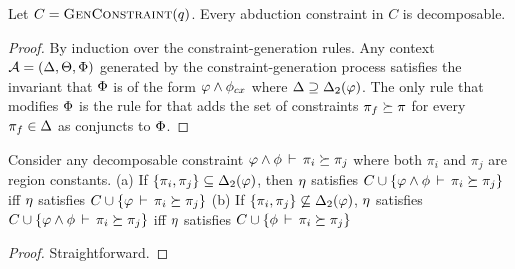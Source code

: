 \begin{lemma}
  \label{lemma:gc-is-decomposable}
  Let $C = \textsc{GenConstraint}(q)$. Every abduction constraint in $C$ is decomposable.
\end{lemma}

\begin{proof}
  By induction over the constraint-generation rules.
  Any context ${\mathcal{A}} = (\Delta,\Theta,\Phi)$ generated by the constraint-generation
  process satisfies the invariant that $\Phi$ is of the form $\varphi \wedge \phi_{cx}$
  where $\Delta \supseteq {\Delta_2}(\varphi)$.
  The only rule that modifies $\Phi$ is the rule for 
  that adds the set of constraints $\pi_f \succeq \pi$ for every $\pi_f \in \Delta$
  as conjuncts to $\Phi$.
\end{proof}




\begin{lemma}
  \label{lemma:decomposition}
  Consider any decomposable constraint  $\varphi \wedge \phi\,\vdash\,\pi_i \succeq \pi_j$
where both $\pi_i$ and $\pi_j$ are region constants.
(a) If $\{ \pi_i, \pi_j \} \subseteq {\Delta_2}(\varphi)$,
then $\eta$ satisfies $C \cup \{ \varphi \wedge \phi\,\vdash\,\pi_i \succeq \pi_j \}$
iff
$\eta$ satisfies $C \cup \{ \varphi\,\vdash\,\pi_i \succeq \pi_j \}$
  (b) If $\{ \pi_i, \pi_j \} \not \subseteq {\Delta_2}(\varphi)$,
$\eta$ satisfies $C \cup \{ \varphi \wedge \phi\,\vdash\,\pi_i \succeq \pi_j \}$
iff
$\eta$ satisfies $C \cup \{ \phi\,\vdash\,\pi_i \succeq \pi_j \}$
\end{lemma}

\begin{proof}
  Straightforward.
\end{proof}

